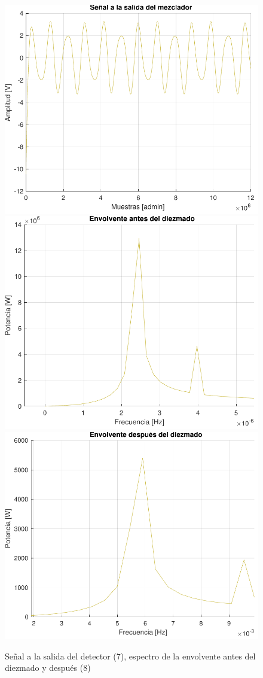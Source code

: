 \begin{figure}[!htb]
    \centering
    \includegraphics[width=0.6\linewidth]{include//figures/detector.pdf}
    \includegraphics[width=0.45\linewidth]{include//figures/envolvente_antes.pdf}
    \includegraphics[width=0.45\linewidth]{include//figures/envolvente_despues.pdf}
    \caption{Señal a la salida del detector (7), espectro de la envolvente antes del diezmado y después (8)} 
\end{figure}


